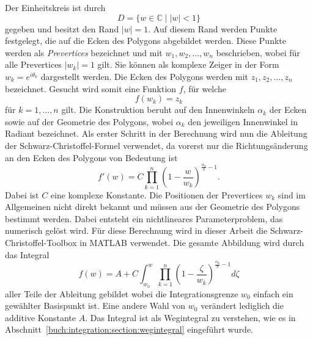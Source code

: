 Der Einheitskreis ist durch
\begin{equation*}
	D = \{w \in \mathbb{C} \mid |w| < 1\}
\end{equation*}
gegeben und besitzt den Rand $|w|=1$.
Auf diesem Rand werden Punkte festgelegt, die auf die Ecken des Polygons abgebildet werden.
Diese Punkte werden als \emph{Prevertices} bezeichnet und mit
$w_1,w_2,\ldots,w_n$ beschrieben, wobei für alle Prevertices $|w_k|=1$ gilt.
Sie können als komplexe Zeiger in der Form
$w_k=e^{i\theta_k}$ dargestellt werden.
Die Ecken des Polygons werden mit $z_1,z_2,\ldots,z_n$ bezeichnet.
Gesucht wird somit eine Funktion $f$, für welche
\begin{equation*}
	f(w_k) = z_k
\end{equation*}
für $k = 1,\ldots,n$ gilt.
Die Konstruktion beruht auf den Innenwinkeln $\alpha_k$ der Ecken sowie auf der Geometrie des Polygons, wobei $\alpha_k$ den jeweiligen Innenwinkel in Radiant bezeichnet.
Als erster Schritt in der Berechnung wird nun die Ableitung der Schwarz-Christoffel-Formel verwendet, da vorerst nur die Richtungsänderung an den Ecken des Polygons von Bedeutung ist
\begin{equation}
	f'(w) = C \prod_{k=1}^{n} \left(1-\frac{w}{w_k}\right)^{\frac{\alpha_k}{\pi}-1}.
	\label{elektro:equation:SchwarzChristoffelDerivative}
\end{equation}
Dabei ist $C$ eine komplexe Konstante.
Die Positionen der Prevertices $w_k$ sind im Allgemeinen nicht direkt bekannt und müssen aus der Geometrie des Polygons bestimmt werden.
Dabei entsteht ein nichtlineares Parameterproblem, das numerisch gelöst wird.
Für diese Berechnung wird in dieser Arbeit die Schwarz-Christoffel-Toolbox in MATLAB verwendet.
Die gesamte Abbildung wird durch das Integral
\begin{equation}
	f(w) = A + C \int_{w_0}^{w}\prod_{k=1}^{n} \left(1-\frac{\zeta}{w_k}\right)^{\frac{\alpha_k}{\pi}-1} d\zeta
	\label{elektro:equation:SchwarzChristoffel}
\end{equation}
aller Teile der Ableitung gebildet wobei die Integrationsgrenze $w_0$ einfach ein gewählter Basispunkt ist.
Eine andere Wahl von $w_0$ verändert lediglich die additive Konstante $A$.
Das Integral ist als Wegintegral zu verstehen, wie es in Abschnitt~\ref{buch:integration:section:wegintegral} eingeführt wurde.

